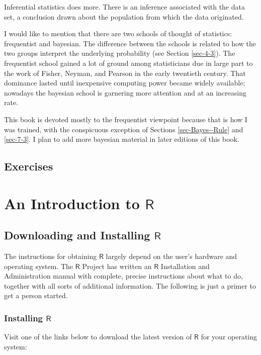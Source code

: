 \documentclass[captions=tableheading]{scrbook}
\begin{document}
Inferential statistics does more. There is an inference associated with the data set, a conclusion drawn about the population from which the data originated.

I would like to mention that there are two schools of thought of statistics: frequentist and bayesian. The difference between the schools is related to how the two groups interpret the underlying probability (see Section \ref{sec-4-3}). The frequentist school gained a lot of ground among statisticians due in large part to the work of Fisher, Neyman, and Pearson in the early twentieth century. That dominance lasted until inexpensive computing power became widely available; nowadays the bayesian school is garnering more attention and at an increasing rate.

This book is devoted mostly to the frequentist viewpoint because that is how I was trained, with the conspicuous exception of Sections \ref{sec-Bayes--Rule} and \ref{sec-7-3}. I plan to add more bayesian material in later editions of this book.

\newpage{}
\section{Exercises}
\label{sec-1-3}

\setcounter{thm}{0}
\chapter{An Introduction to \(\mathsf{R}\)}
\label{sec-2}
\label{cha-introduction-to-R}
\section{Downloading and Installing \(\mathsf{R}\)}
\label{sec-2-1}
\label{sec-download-install-R}


The instructions for obtaining \(\mathsf{R}\) largely depend on the user's hardware and operating system. The \(\mathsf{R}\)  Project has written an \(\mathsf{R}\)  Installation and Administration manual with complete, precise instructions about what to do, together with all sorts of additional information. The following is just a primer to get a person started.
\subsection{Installing \(\mathsf{R}\)}
\label{sec-2-1-1}


Visit one of the links below to download the latest version of \(\mathsf{R}\) 
for your operating system:
\end{document}
